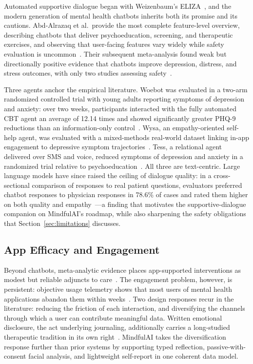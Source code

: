 \documentclass[11pt,a4paper]{article}
\newcommand{\system}{MindfulAI}
\begin{document}
Automated supportive dialogue began with Weizenbaum's ELIZA~\cite{weizenbaum1966}, and the modern generation of mental health chatbots inherits both its promise and its cautions. Abd-Alrazaq et al.\ provide the most complete feature-level overview, describing chatbots that deliver psychoeducation, screening, and therapeutic exercises, and observing that user-facing features vary widely while safety evaluation is uncommon~\cite{abdalrazaq2019}. Their subsequent meta-analysis found weak but directionally positive evidence that chatbots improve depression, distress, and stress outcomes, with only two studies assessing safety~\cite{abdalrazaq2020}.

Three agents anchor the empirical literature. Woebot was evaluated in a two-arm randomized controlled trial with young adults reporting symptoms of depression and anxiety: over two weeks, participants interacted with the fully automated CBT agent an average of 12.14 times and showed significantly greater PHQ-9 reductions than an information-only control~\cite{fitzpatrick2017}. Wysa, an empathy-oriented self-help agent, was evaluated with a mixed-methods real-world dataset linking in-app engagement to depressive symptom trajectories~\cite{inkster2018}. Tess, a relational agent delivered over SMS and voice, reduced symptoms of depression and anxiety in a randomized trial relative to psychoeducation~\cite{fulmer2018}. All three are text-centric. Large language models have since raised the ceiling of dialogue quality: in a cross-sectional comparison of responses to real patient questions, evaluators preferred chatbot responses to physician responses in 78.6\% of cases and rated them higher on both quality and empathy~\cite{ayers2023}---a finding that motivates the supportive-dialogue companion on \system{}'s roadmap, while also sharpening the safety obligations that Section~\ref{sec:limitations} discusses.

\subsection{App Efficacy and Engagement}\label{sec:efficacy}

Beyond chatbots, meta-analytic evidence places app-supported interventions as modest but reliable adjuncts to care~\cite{linardon2019}. The engagement problem, however, is persistent: objective usage telemetry shows that most users of mental health applications abandon them within weeks~\cite{baumel2019}. Two design responses recur in the literature: reducing the friction of each interaction, and diversifying the channels through which a user can contribute meaningful data. Written emotional disclosure, the act underlying journaling, additionally carries a long-studied therapeutic tradition in its own right~\cite{pennebaker1997}. \system{} takes the diversification response further than prior systems by supporting typed reflection, passive-with-consent facial analysis, and lightweight self-report in one coherent data model.
\end{document}
